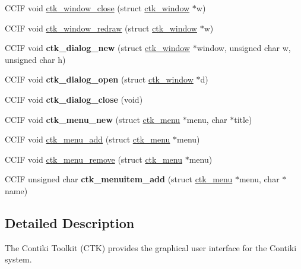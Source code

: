 \begin{DoxyCompactItemize}
\item 
C\+C\+I\+F void \hyperlink{group__ctk_gac6884a9059b5b49128d1c12f222ba13a}{ctk\+\_\+window\+\_\+close} (struct \hyperlink{structctk__window}{ctk\+\_\+window} $\ast$w)
\item 
C\+C\+I\+F void \hyperlink{group__ctk_ga8860c2bfca9496a5293afa3b01c173cb}{ctk\+\_\+window\+\_\+redraw} (struct \hyperlink{structctk__window}{ctk\+\_\+window} $\ast$w)
\item 
\hypertarget{group__ctk_gaef80f89407b788d66b34c0589e2fc53e}{}C\+C\+I\+F void {\bfseries ctk\+\_\+dialog\+\_\+new} (struct \hyperlink{structctk__window}{ctk\+\_\+window} $\ast$window, unsigned char w, unsigned char h)\label{group__ctk_gaef80f89407b788d66b34c0589e2fc53e}

\item 
\hypertarget{group__ctk_ga268d6d28397d385a8fbbe0d96b0a32a1}{}C\+C\+I\+F void {\bfseries ctk\+\_\+dialog\+\_\+open} (struct \hyperlink{structctk__window}{ctk\+\_\+window} $\ast$d)\label{group__ctk_ga268d6d28397d385a8fbbe0d96b0a32a1}

\item 
\hypertarget{group__ctk_gafb1f2e9b3fdc8de2895634c94a258f93}{}C\+C\+I\+F void {\bfseries ctk\+\_\+dialog\+\_\+close} (void)\label{group__ctk_gafb1f2e9b3fdc8de2895634c94a258f93}

\item 
\hypertarget{group__ctk_gac972bb4c7735630f7d76e5a4e0b812d6}{}C\+C\+I\+F void {\bfseries ctk\+\_\+menu\+\_\+new} (struct \hyperlink{structctk__menu}{ctk\+\_\+menu} $\ast$menu, char $\ast$title)\label{group__ctk_gac972bb4c7735630f7d76e5a4e0b812d6}

\item 
C\+C\+I\+F void \hyperlink{group__ctk_gad5a6d1016430b53333d7b06e8aa1b85e}{ctk\+\_\+menu\+\_\+add} (struct \hyperlink{structctk__menu}{ctk\+\_\+menu} $\ast$menu)
\item 
C\+C\+I\+F void \hyperlink{group__ctk_gadef4466ac1a86b6de5f19b68bc92ef58}{ctk\+\_\+menu\+\_\+remove} (struct \hyperlink{structctk__menu}{ctk\+\_\+menu} $\ast$menu)
\item 
\hypertarget{group__ctk_gaede814d8bd4d3ff89bb6395e6c91cf26}{}C\+C\+I\+F unsigned char {\bfseries ctk\+\_\+menuitem\+\_\+add} (struct \hyperlink{structctk__menu}{ctk\+\_\+menu} $\ast$menu, char $\ast$name)\label{group__ctk_gaede814d8bd4d3ff89bb6395e6c91cf26}

\end{DoxyCompactItemize}


\subsection{Detailed Description}
The Contiki Toolkit (C\+T\+K) provides the graphical user interface for the Contiki system. 

